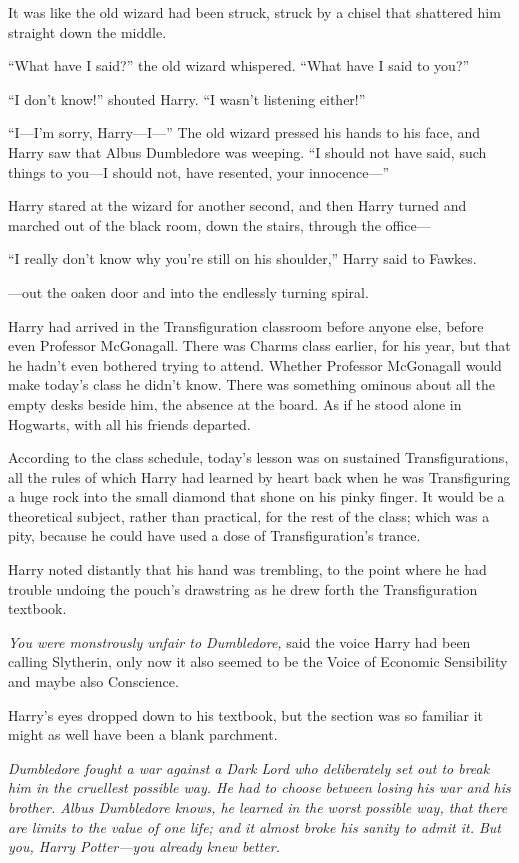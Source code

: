 It was like the old wizard had been struck, struck by a chisel that shattered him straight down the middle.

“What have I said?” the old wizard whispered.
“What have I said to you?”

“I don’t know!” shouted Harry.
“I wasn’t listening either!”

“I—I’m sorry, Harry—I—” The old wizard pressed his hands to his face, and Harry saw that Albus Dumbledore was weeping.
“I should not have said, such things to you—I should not, have resented, your innocence—”

Harry stared at the wizard for another second, and then Harry turned and marched out of the black room, down the stairs, through the office—

“I really don’t know why you’re still on his shoulder,” Harry said to Fawkes.

—out the oaken door and into the endlessly turning spiral.

\later

Harry had arrived in the Transfiguration classroom before anyone else, before even Professor McGonagall. There was Charms class earlier, for his year, but that he hadn’t even bothered trying to attend. Whether Professor McGonagall would make today’s class he didn’t know. There was something ominous about all the empty desks beside him, the absence at the board. As if he stood alone in Hogwarts, with all his friends departed.

According to the class schedule, today’s lesson was on sustained Transfigurations, all the rules of which Harry had learned by heart back when he was Transfiguring a huge rock into the small diamond that shone on his pinky finger. It would be a theoretical subject, rather than practical, for the rest of the class; which was a pity, because he could have used a dose of Transfiguration’s trance.

Harry noted distantly that his hand was trembling, to the point where he had trouble undoing the pouch’s drawstring as he drew forth the Transfiguration textbook.

\emph{You were monstrously unfair to Dumbledore,} said the voice Harry had been calling Slytherin, only now it also seemed to be the Voice of Economic Sensibility and maybe also Conscience.

Harry’s eyes dropped down to his textbook, but the section was so familiar it might as well have been a blank parchment.

\emph{Dumbledore fought a war against a Dark Lord who deliberately set out to break him in the cruellest possible way. He had to choose between losing his war and his brother. Albus Dumbledore knows, he learned in the worst possible way, that there are limits to the value of one life; and it almost broke his sanity to admit it. But you, Harry Potter—\emph{you} already knew better.}

